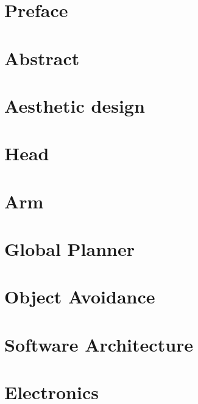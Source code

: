 \documentclass[a4paper,10pt,titlepage]{report}
\begin{document}

\newpage


\newpage
{}

\newcommand{\todo}[1]{\textbf{\textsc{\textcolor{red}{[#1]}}}}

\chapter{Preface}

\label{preface}

\chapter{Abstract}

\label{abstract}
\newpage

\tableofcontents

\chapter{Aesthetic design}

\label{aesthetic_design}

\chapter{Head}

\label{head}

\chapter{Arm}

\label{arm}


\chapter{Global Planner}

\label{global_planner}

\chapter{Object Avoidance}

\label{object_avoidance}

\chapter{Software Architecture}
\label{Software Architecture}


\chapter{Electronics}

\label{electronics}
\end{document}
